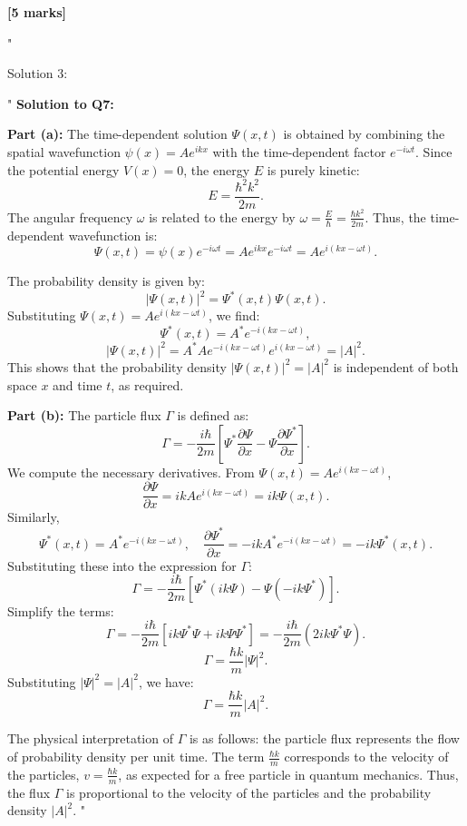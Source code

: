 \textbf{[5 marks]}

"

Solution 3:

"
\textbf{Solution to Q7:}

\textbf{Part (a):}  
The time-dependent solution $\Psi(x,t)$ is obtained by combining the spatial wavefunction $\psi(x) = A e^{ikx}$ with the time-dependent factor $e^{-i\omega t}$. Since the potential energy $V(x) = 0$, the energy $E$ is purely kinetic:  
\[
E = \frac{\hbar^2 k^2}{2m}.
\]  
The angular frequency $\omega$ is related to the energy by $\omega = \frac{E}{\hbar} = \frac{\hbar k^2}{2m}$. Thus, the time-dependent wavefunction is:  
\[
\Psi(x,t) = \psi(x)e^{-i\omega t} = A e^{ikx} e^{-i\omega t} = A e^{i(kx - \omega t)}.
\]

The probability density is given by:  
\[
|\Psi(x,t)|^2 = \Psi^*(x,t)\Psi(x,t).
\]  
Substituting $\Psi(x,t) = A e^{i(kx - \omega t)}$, we find:  
\[
\Psi^*(x,t) = A^* e^{-i(kx - \omega t)},
\]
\[
|\Psi(x,t)|^2 = A^*A e^{-i(kx - \omega t)}e^{i(kx - \omega t)} = |A|^2.
\]
This shows that the probability density $|\Psi(x,t)|^2 = |A|^2$ is independent of both space $x$ and time $t$, as required.

\textbf{Part (b):}  
The particle flux $\Gamma$ is defined as:  
\[
\Gamma = -\frac{i\hbar}{2m} \left[ \Psi^* \frac{\partial \Psi}{\partial x} - \Psi \frac{\partial \Psi^*}{\partial x} \right].
\]
We compute the necessary derivatives. From $\Psi(x,t) = A e^{i(kx - \omega t)}$,  
\[
\frac{\partial \Psi}{\partial x} = i k A e^{i(kx - \omega t)} = i k \Psi(x,t).
\]
Similarly,  
\[
\Psi^*(x,t) = A^* e^{-i(kx - \omega t)}, \quad \frac{\partial \Psi^*}{\partial x} = -i k A^* e^{-i(kx - \omega t)} = -i k \Psi^*(x,t).
\]
Substituting these into the expression for $\Gamma$:  
\[
\Gamma = -\frac{i\hbar}{2m} \left[ \Psi^* (i k \Psi) - \Psi (-i k \Psi^*) \right].
\]
Simplify the terms:  
\[
\Gamma = -\frac{i\hbar}{2m} \left[ i k \Psi^* \Psi + i k \Psi \Psi^* \right] = -\frac{i\hbar}{2m} (2 i k \Psi^* \Psi).
\]
\[
\Gamma = \frac{\hbar k}{m} |\Psi|^2.
\]
Substituting $|\Psi|^2 = |A|^2$, we have:  
\[
\Gamma = \frac{\hbar k}{m} |A|^2.
\]

The physical interpretation of $\Gamma$ is as follows: the particle flux represents the flow of probability density per unit time. The term $\frac{\hbar k}{m}$ corresponds to the velocity of the particles, $v = \frac{\hbar k}{m}$, as expected for a free particle in quantum mechanics. Thus, the flux $\Gamma$ is proportional to the velocity of the particles and the probability density $|A|^2$.
"

